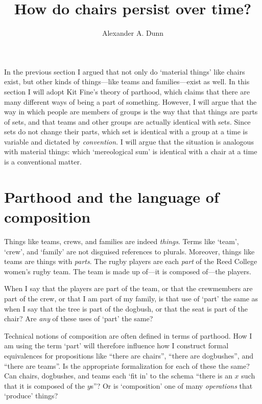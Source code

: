 \documentclass[11pt]{article}
\title{How do chairs persist over time?}
\author{Alexander A. Dunn}
\begin{document}
\ifstandalone
\maketitle
\begin{spacing}{1.5}
\fi

\label{parts}

In the previous section I argued that not only do `material things'
like chairs exist, but other kinds of things---like teams and
families---exist as well.  In this section I will adopt Kit Fine's
theory of parthood, which claims that there are many different ways of
being a part of something.  However, I will argue that the way in
which people are members of groups is the way that that things are
parts of sets, and that teams and other groups are actually identical
with sets.  Since sets do not change their parts, which set is
identical with a group at a time is variable and dictated by {\em
  convention}.  I will argue that the situation is analogous with
material things: which `mereological sum' is identical with a chair at
a time is a conventional matter.

\section{Parthood and the language of composition}
\label{parthood}
Things like teams, crews, and families are indeed {\em things}.  Terms
like `team', `crew', and `family' are not disguised references to
plurals.  Moreover, things like teams are things with {\em parts}.
The rugby players are each {\em part} of the Reed College women's
rugby team.  The team is made up of---it is composed of---the players.

When I say that the players are part of the team, or that the
crewmembers are part of the crew, or that I am part of my family, is
that use of `part' the same as when I say that the tree is part of the
dogbush, or that the seat is part of the chair?  Are {\em any} of
these uses of `part' the same?

Technical notions of composition are often defined in terms of
parthood.  How I am using the term `part' will therefore influence how
I construct formal equivalences for propositions like ``there are
chairs'', ``there are dogbushes'', and ``there are teams''.  Is the
appropriate formalization for each of these the same?  Can chairs,
dogbushes, and teams each `fit in' to the schema ``there is an $x$
such that it is composed of the $y$s''?  Or is `composition' one of
many {\em operations} that `produce' things?


\end{spacing}
\end{document}
